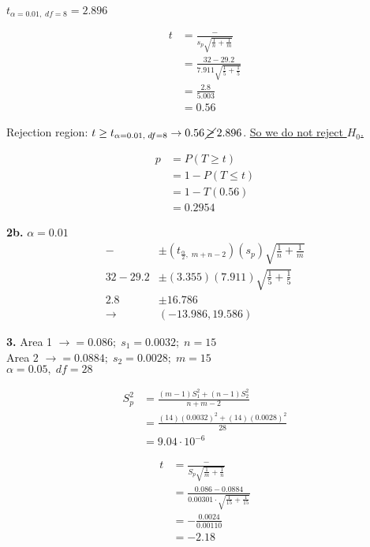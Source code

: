 \documentclass[12pt]{report}
\makeatletter
\newcommand*{\Xbar}{}%
\DeclareRobustCommand*{\Xbar}{%
	\mathpalette\@Xbar{}%
}
\newcommand*{\@Xbar}[2]{%
	\sbox0{$#1\mathrm{X}\m@th$}%
	\sbox2{$#1X\m@th$}%
	\rlap{%
		\hbox to\wd2{%
			\hfill
			$\overline{%
				\vrule width 0pt height\ht0 %
				\kern\wd0 %
			}$%
		}%
	}%
	\copy2 %
}
\newcommand*{\Ybar}{}%
\DeclareRobustCommand*{\Ybar}{%
	\mathpalette\@Ybar{}%
}
\newcommand*{\@Ybar}[2]{%
	\sbox0{$#1\mathrm{Y}\m@th$}%
	\sbox2{$#1Y\m@th$}%
	\rlap{%
		\hbox to\wd2{%
			\hfill
			$\overline{%
				\vrule width 0pt height\ht0 %
				\kern\wd0 %
			}$%
		}%
	}%
	\copy2 %
}
\makeatother
\begin{document}
\noindent $t_{\alpha=0.01,\;df=8} = 2.896$

\begin{align*}
	t &= \frac{\Xbar - \Ybar}{s_p\sqrt{\frac{1}{n} + \frac{1}{m}}}\\
	&= \frac{32 - 29.2}{7.911\sqrt{\frac{1}{5} + \frac{1}{5}}}\\
	&= \frac{2.8}{5.003}\\
	&= 0.56
\end{align*}

\noindent Rejection region: $t \geq t_{\alpha = 0.01,\;df = 8} \rightarrow  0.56 \,\cancel{\geq}\, 2.896$. \underline{So we do not reject $H_0$.}

\begin{align*}
	p &= P(T \geq t)\\
	&= 1 - P(T \leq t)\\
	&= 1 - T(0.56)\\
	&= \boxed{0.2954}
\end{align*}

\pagebreak

\noindent \textbf{2b.} $\alpha = 0.01$
\begin{align*}
	\Xbar - \Ybar &\pm (t_{\frac{\alpha}{2},\;m+n-2})(s_p)\sqrt{\frac{1}{n}+\frac{1}{m}}\\
	32 - 29.2 &\pm (3.355) (7.911)\sqrt{\frac{1}{5} + \frac{1}{5}}\\
	2.8 &\pm 16.786\\
	\rightarrow& \boxed{ (-13.986, 19.586)}
\end{align*}

\noindent \textbf{3.} Area 1 $\rightarrow \Xbar = 0.086;\; s_1 = 0.0032;\;n=15$\\
Area 2 $\rightarrow \Ybar = 0.0884;\; s_2 = 0.0028;\;m=15$\\

\noindent $\alpha = 0.05,\; df = 28$

\begin{align*}
	S_p^2 &= \frac{(m-1)S_1^2 + (n-1)S_2^2}{n+m-2}\\
	&= \frac{(14)(0.0032)^2 + (14)(0.0028)^2}{28}\\
	&= 9.04 \cdot 10^{-6}
\end{align*}

\begin{align*}
	t &= \frac{\Xbar - \Ybar}{S_p\sqrt{\frac{1}{m}+\frac{1}{n}}}\\
	&= \frac{0.086 - 0.0884}{0.00301\cdot\sqrt{\frac{1}{15}+\frac{1}{15}}}\\
	&= -\frac{0.0024}{0.00110}\\
	&= \boxed{-2.18}
\end{align*}
\end{document}
